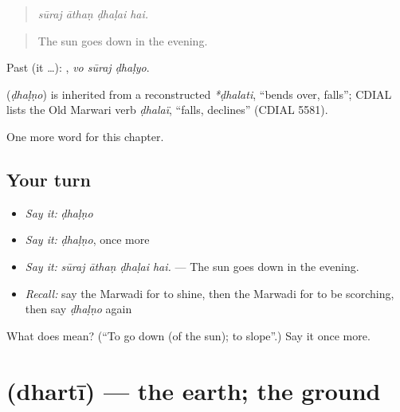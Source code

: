 \begin{quote}
   
\end{quote}

\begin{quote}
\emph{sūraj āthaṇ ḍhaḷai hai.}
\end{quote}

\begin{quote}
The sun goes down in the evening.
\end{quote}

Past (it …):   , \emph{vo sūraj ḍhaḷyo}.

\begin{cousinweb}
\textbf{} (\emph{ḍhaḷṇo}) is inherited from a reconstructed \emph{*ḍhalati}, \textquotedblleft{}bends over, falls\textquotedblright{}; CDIAL lists the Old Marwari verb \emph{ḍhalaï}, \textquotedblleft{}falls, declines\textquotedblright{} (CDIAL 5581).
\end{cousinweb}

\begin{grammarlens}[title={What you've built}]
One more word for this chapter.
\end{grammarlens}

\subsection*{Your turn}
\begin{itemize}
\raggedright
  \item \emph{Say it:} \emph{ḍhaḷṇo}
  \item \emph{Say it:} \emph{ḍhaḷṇo}, once more
  \item \emph{Say it:} \emph{sūraj āthaṇ ḍhaḷai hai.} — The sun goes down in the evening.
  \item \emph{Recall:} say the Marwadi for to shine, then the Marwadi for to be scorching, then say \emph{ḍhaḷṇo} again
\end{itemize}

\begin{tcolorbox}[breakable,colback=teal!4,colframe=teal!35!black,title={Before you move on}]
What does  mean? (\textquotedblleft{}To go down (of the sun); to slope\textquotedblright{}.) Say it once more.
\end{tcolorbox}
\section[\texorpdfstring{\mw{धरती} (dhartī)}{धरती (dhartī)}]{ (dhartī) — the earth; the ground}

